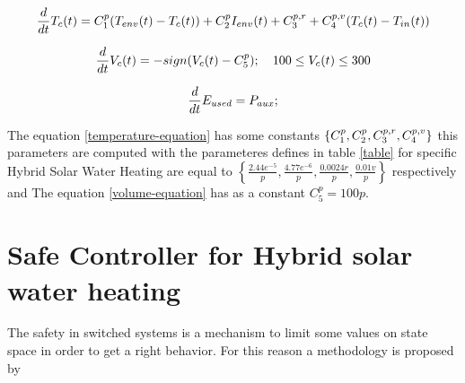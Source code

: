
\begin{equation}
  \frac{d}{dt}T_{c}(t) = C^p_1(T_{env}(t)-T_{c}(t))+C^p_{2}I_{env}(t)+C^{p,r}_{3}+C^{p,v}_{4}(T_{c}(t)-T_{in}(t))
  \label{temperature-equation}
\end{equation}

\begin{equation}
  \frac{d}{dt}V_{c}(t) = -sign(V_{c}(t)-C^p_5); \quad 100 \leq V_{c}(t) \leq 300
  \label{volume-equation}
\end{equation}

\begin{equation} 
  \frac{d}{dt}E_{used} = P_{aux};
  \label{Energy-equation}
\end{equation}

The equation \ref{temperature-equation} has some constants $\left\lbrace 
C^p_1, C^p_{2}, C^{p,r}_{3}, C^{p,v}_{4} \right\rbrace $ this
 parameters are computed with the parameteres defines in table \ref{table} for specific Hybrid Solar Water Heating
  are equal to $\left\lbrace \frac{2.44e^{-5}}{p}, \frac{4.77e^{-6}}{p}
  , \frac{0.0024r}{p}, \frac{0.01v}{ p}  \right\rbrace$ respectively 
  and The equation \ref{volume-equation} has as a constant 
  $ C^p_5 = 100p $.


\section{Safe Controller for Hybrid solar water heating}

  The safety in switched systems is a mechanism to limit some values on 
  state space in order to get a right behavior. For this reason a methodology
  is proposed by \cite{}



  
